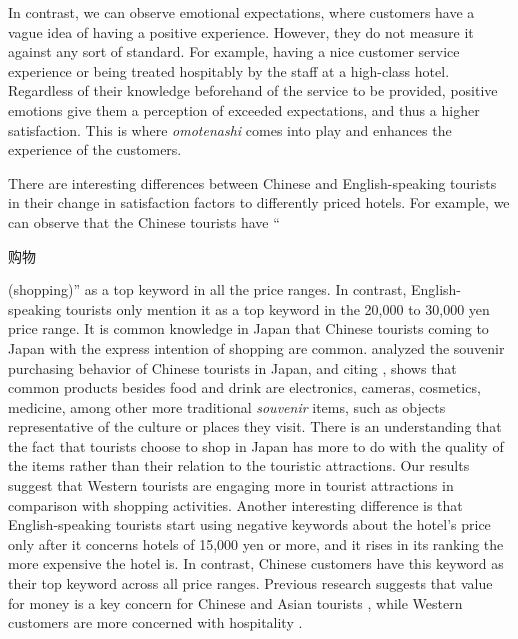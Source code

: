 \documentclass[smallextended,natbib]{svjour3}       %
\begin{document}
    In contrast, we can observe emotional expectations, where customers have a vague idea of having a positive experience. However, they do not measure it against any sort of standard. For example, having a nice customer service experience or being treated hospitably by the staff at a high-class hotel. Regardless of their knowledge beforehand of the service to be provided, positive emotions give them a perception of exceeded expectations, and thus a higher satisfaction. This is where \textit{omotenashi} comes into play and enhances the experience of the customers. 

    There are interesting differences between Chinese and English-speaking tourists in their change in satisfaction factors to differently priced hotels. For example, we can observe that the Chinese tourists have ``\begin{CJK}{UTF8}{gbsn}购物\end{CJK} (shopping)'' as a top keyword in all the price ranges. In contrast, English-speaking tourists only mention it as a top keyword in the 20,000 to 30,000 yen price range. It is common knowledge in Japan that Chinese tourists coming to Japan with the express intention of shopping are common. \cite{tsujimoto2017purchasing} analyzed the souvenir purchasing behavior of Chinese tourists in Japan, and citing \cite{japan2014consumption}, shows that common products besides food and drink are electronics, cameras, cosmetics, medicine, among other more traditional \textit{souvenir} items, such as objects representative of the culture or places they visit. There is an understanding that the fact that tourists choose to shop in Japan has more to do with the quality of the items rather than their relation to the touristic attractions. Our results suggest that Western tourists are engaging more in tourist attractions in comparison with shopping activities. Another interesting difference is that English-speaking tourists start using negative keywords about the hotel's price only after it concerns hotels of 15,000 yen or more, and it rises in its ranking the more expensive the hotel is. In contrast, Chinese customers have this keyword as their top keyword across all price ranges. Previous research suggests that value for money is a key concern for Chinese and Asian tourists \cite[][]{choi2000,choi2001,truong2009}, while Western customers are more concerned with hospitality \cite[][]{kozak2002}.  
\end{document}
